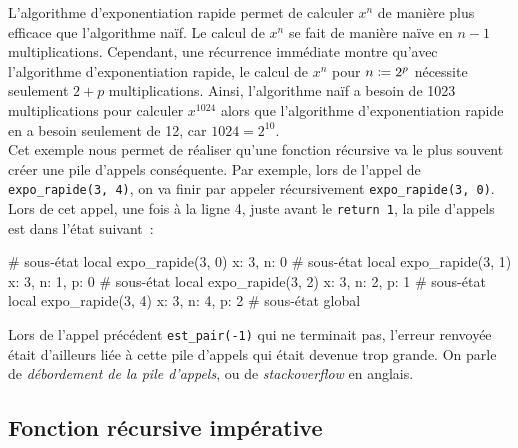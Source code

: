 \documentclass{magnoliaold}
\begin{document}
\noindent
L'algorithme d'exponentiation rapide permet de calculer $x^n$ de manière plus efficace
que l'algorithme naïf. Le calcul de $x^n$ se fait de manière naïve en $n-1$ multiplications.
Cependant, une récurrence immédiate montre qu'avec l'algorithme d'exponentiation rapide,
le calcul de $x^n$ pour $n\coloneqq 2^p$ nécessite seulement $2+p$ multiplications.
Ainsi, l'algorithme naïf a besoin de 1023 multiplications pour calculer $x^{1024}$ alors
que l'algorithme d'exponentiation rapide en a besoin seulement de 12, car $1024=2^{10}$.\\

Cet exemple nous permet de réaliser qu'une fonction récursive va le plus souvent
créer une pile d'appels conséquente. Par exemple, lors de l'appel
de \verb!expo_rapide(3, 4)!, on va finir par appeler récursivement
\verb!expo_rapide(3, 0)!. Lors de cet appel, une fois à la ligne 4, juste avant
le \verb!return 1!, la pile d'appels est dans l'état suivant~:

\begin{pythoncode}
# sous-état local expo_rapide(3, 0)  {x: 3, n: 0}
# sous-état local expo_rapide(3, 1)  {x: 3, n: 1, p: 0}
# sous-état local expo_rapide(3, 2)  {x: 3, n: 2, p: 1}
# sous-état local expo_rapide(3, 4)  {x: 3, n: 4, p: 2}
# sous-état global                   {}
\end{pythoncode}
\noindent Lors de l'appel précédent \verb!est_pair(-1)! qui ne terminait pas, l'erreur renvoyée était d'ailleurs
liée à cette pile d'appels qui était devenue trop grande. On parle de \emph{débordement
de la pile d'appels}, ou de \emph{stackoverflow} en anglais.


\subsection{Fonction récursive impérative}
\end{document}
